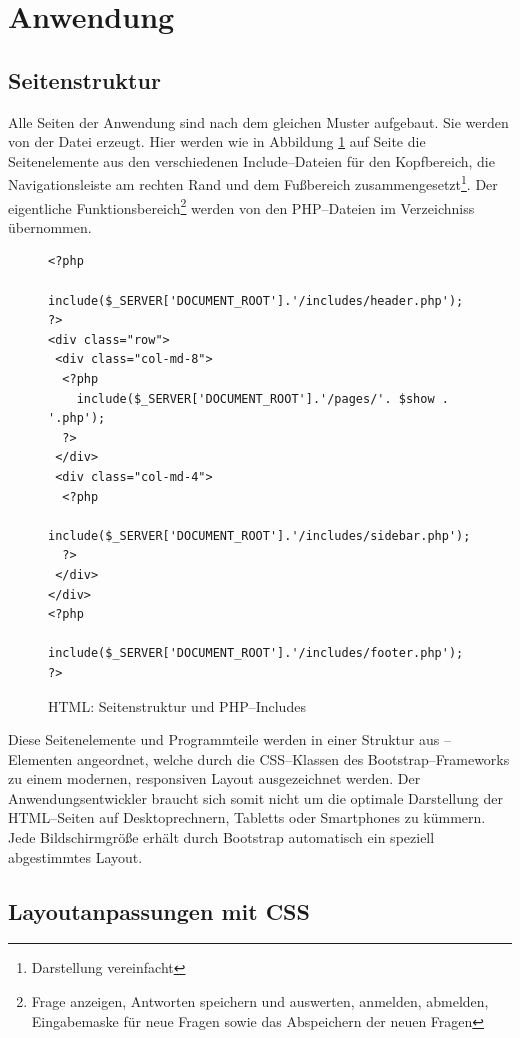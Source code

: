 \section{Anwendung}
\label{sec:anwendung}
\subsection{Seitenstruktur}

Alle Seiten der Anwendung sind nach dem gleichen Muster aufgebaut. Sie werden von der Datei  erzeugt. Hier werden wie in Abbildung \ref{fig:struktur} auf Seite \pageref{fig:struktur} die Seitenelemente aus den verschiedenen Include--Dateien für den Kopfbereich, die Navigationsleiste am rechten Rand und dem Fußbereich zusammengesetzt\footnote{Darstellung vereinfacht}. Der eigentliche Funktionsbereich\footnote{Frage anzeigen, Antworten speichern und auswerten, anmelden, abmelden, Eingabemaske für neue Fragen sowie das Abspeichern der neuen Fragen} werden von den PHP--Dateien im Verzeichniss  übernommen.

\begin{figure}[h]
\begin{spacing}{1.0}	
\begin{verbatim}
<?php 
  include($_SERVER['DOCUMENT_ROOT'].'/includes/header.php'); 
?>
<div class="row">
 <div class="col-md-8">
  <?php 
    include($_SERVER['DOCUMENT_ROOT'].'/pages/'. $show . '.php'); 
  ?> 
 </div>
 <div class="col-md-4">
  <?php 
    include($_SERVER['DOCUMENT_ROOT'].'/includes/sidebar.php'); 
  ?>
 </div>	  
</div>
<?php 
  include($_SERVER['DOCUMENT_ROOT'].'/includes/footer.php'); 
?>
\end{verbatim}
\caption{HTML: Seitenstruktur und PHP--Includes}
\label{fig:struktur}
\end{spacing}
\end{figure}

Diese Seitenelemente und Programmteile werden in einer Struktur aus --Ele\-menten angeordnet, welche durch die CSS--Klassen des Bootstrap--Frameworks zu einem modernen, responsiven Layout ausgezeichnet werden. Der Anwendungsentwickler braucht sich somit nicht um die optimale Darstellung der HTML--Seiten auf Desktoprechnern, Tabletts oder Smartphones zu kümmern. Jede Bildschirmgröße erhält durch Bootstrap automatisch ein speziell abgestimmtes Layout.

\subsection{Layoutanpassungen mit CSS}

